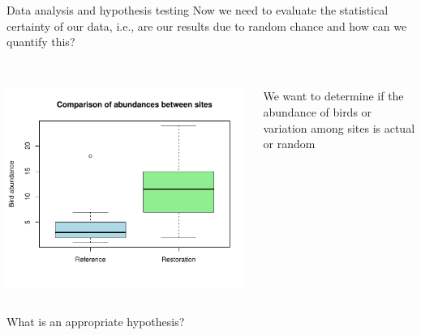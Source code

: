 \documentclass[xcolor=svgnames]{beamer}
\begin{document}
\begin{frame}{Data analysis and hypothesis testing}
Now we need to evaluate the statistical certainty of our data, i.e., are our results due to random chance and how can we quantify this?\\~\\
\begin{columns}
\begin{column}{0.5\textwidth}
\begin{center}
\includegraphics[width=\textwidth,trim=0in 0in 0.3in 0.3in]{R_for_data_analysis-box2.pdf}
\end{center}
\end{column}
\begin{column}{0.5\textwidth}
We want to determine if the abundance of birds or variation among sites is actual or random\\~\\
\end{column}
\end{columns}
\centerline{What is an appropriate hypothesis?}
\end{frame}
\end{document}
